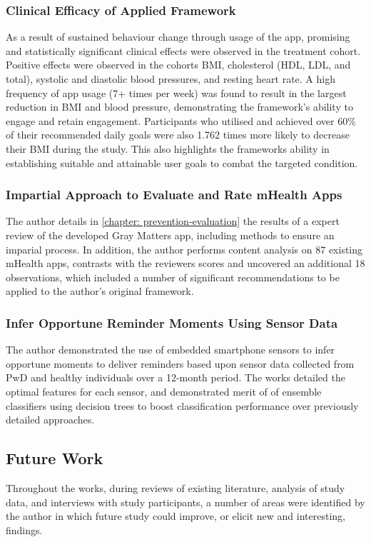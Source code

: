 \subsubsection{Clinical Efficacy of Applied Framework}
As a result of sustained behaviour change through usage of the app, promising and statistically significant clinical effects were observed in the treatment cohort. Positive effects were observed in the cohorts BMI, cholesterol (HDL, LDL, and total), systolic and diastolic blood pressures, and resting heart rate. A high frequency of app usage (7+ times per week) was found to result in the largest reduction in BMI and blood pressure, demonstrating the framework's  ability to engage and retain engagement. Participants who utilised and achieved over 60\% of their recommended daily goals were also 1.762 times more likely to decrease their BMI during the study. This also highlights the frameworks ability in establishing suitable and attainable user goals to combat the targeted condition. 

\subsubsection{Impartial Approach to Evaluate and Rate mHealth Apps}
The author details in \ref{chapter: prevention-evaluation} the results of a expert review of the developed Gray Matters app, including methods to ensure an imparial process. In addition, the author performs content analysis on 87 existing mHealth apps, contrasts with the reviewers scores and uncovered an additional 18 observations, which included a number of significant recommendations to be applied to the author's original framework.


\subsubsection{Infer Opportune Reminder Moments Using Sensor Data}
The author demonstrated the use of embedded smartphone sensors to infer opportune moments to deliver reminders based upon sensor data collected from PwD and healthy individuals over a 12-month period. The works detailed the optimal features for each sensor, and demonstrated merit of of ensemble classifiers using decision trees to boost classification performance over previously detailed approaches. 


\subsection{Future Work}
Throughout the works, during reviews of existing literature, analysis of study data, and interviews with study participants, a number of areas were identified by the author in which future study could improve, or elicit new and interesting, findings.

